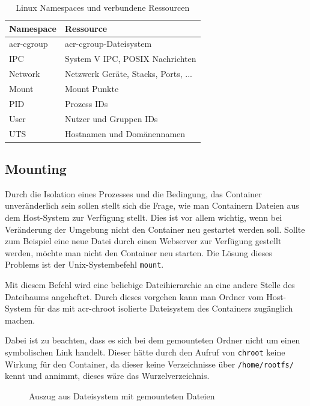 \begin{table}[h]
	\begin{center}
		\begin{tabular}{ll}
			\toprule
			Namespace			& Ressource				 				\\
			\midrule
			\Gls{acr-cgroup}	& \Gls{acr-cgroup}-Dateisystem 			\\
			IPC					& System V IPC, POSIX Nachrichten 		\\
			Network				& Netzwerk Geräte, Stacks, Ports, ...	\\
			Mount				& Mount Punkte							\\
			PID					& Prozess IDs							\\
			User				& Nutzer und Gruppen IDs				\\
			UTS					& Hostnamen und Domänennamen			\\
			\bottomrule
		\end{tabular}
	\end{center}
	\caption{Linux Namespaces und verbundene Ressourcen \citep{Namespaces7LinuxManualPage}}
	\label{tab:namespaces}
\end{table}

\subsection{Mounting}
\label{sec:mount}
Durch die Isolation eines Prozesses und die Bedingung, das Container unveränderlich sein sollen stellt sich die Frage, wie man Containern Dateien aus dem Host-System zur Verfügung stellt. Dies ist vor allem wichtig, wenn bei Veränderung der Umgebung nicht den Container neu gestartet werden soll. Sollte zum Beispiel eine neue Datei durch einen Webserver zur Verfügung gestellt werden, möchte man nicht den Container neu starten. Die Lösung dieses Problems ist der Unix-Systembefehl \texttt{mount}. 

Mit diesem Befehl wird eine beliebige Dateihierarchie an eine andere Stelle des Dateibaums angeheftet. Durch dieses vorgehen kann man Ordner vom Host-System  für das mit \gls{acr-chroot} isolierte Dateisystem des Containers zugänglich machen.

Dabei ist zu beachten, dass es sich bei dem gemounteten Ordner nicht um einen symbolischen Link handelt. Dieser hätte durch den Aufruf von \texttt{chroot} keine Wirkung für den Container, da dieser keine Verzeichnisse über \texttt{/home/rootfs/} kennt und annimmt, dieses wäre das Wurzelverzeichnis.

\begin{figure}[h]
	\centering
	\begin{minipage}{0.9\textwidth}
	\end{minipage}
	\caption{Auszug aus Dateisystem mit gemounteten Dateien}
	\label{fig:mountExample}
\end{figure}

